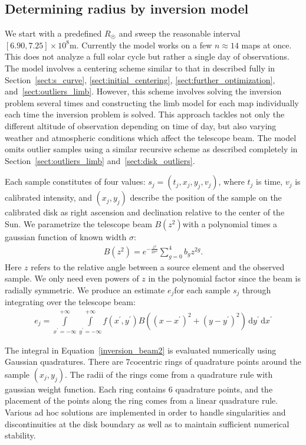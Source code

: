 \documentclass{aa}
\newcommand{\eqnl}[2]{\begin{eqnarray}\label{#1}#2\end{eqnarray}}
\newcommand{\intef}[4]{\int \limits_{#1 = #2}^{#3} \! #4 \, \mathrm{d} #1}
\begin{document}
  \subsection{Determining radius by inversion model} \label{sect:radius_method2}

  We start with a predefined $R_{\astrosun}$ and sweep the reasonable interval $[6.90, 7.25] \times 10^8 \mathrm{m}$. 
  Currently the model works on a few $n \approx 14$ maps at once. This does not analyze a full solar cycle but rather a 
  single day of observations. The model involves a centering scheme similar to that in described fully in 
  Section~\ref{sect:s_curve}, \ref{sect:initial_centering}, \ref{sect:further_optimization}, and~\ref{sect:outliers_limb}. However, this 
  scheme involves solving the inversion problem several times and constructing the limb model for each map individually 
  each time the inversion problem is solved. This approach tackles not only the different altitude of observation 
  depending on time of day, but also varying weather and atmospheric conditions which affect the telescope beam. The 
  model omits outlier samples using a similar recursive scheme as described completely in 
  Section~\ref{sect:outliers_limb} and~\ref{sect:disk_outliers}.

  Each sample constitutes of four values: $s_j = (t_j, x_j, y_j, v_j)$, where $t_j$ is time, $v_j$ is calibrated intensity, 
  and $(x_j,y_j)$ describe the position of the sample on the calibrated disk as right ascension and declination 
  relative to the center of the Sun. We parametrize the telescope beam $B(z^2)$with a polynomial times a gaussian function of known width $\sigma$:
  \eqnl{inversion_beam}{
  B(z^2) = e^{-\frac{z^2}{2 \sigma^2}} \sum \limits_{g=0}^{4} b_g z^{2g} \text{.}
  }
  Here $z$ refers to the relative angle between a source element and the observed sample. We only need even powers of $z$ in the polynomial factor since the beam is radially symmetric. We produce an estimate $e_j$for each sample $s_j$ through integrating over the telescope beam:
  \eqnl{inversion_beam2}{
  e_j = \intef{x^{\prime}}{-\infty}{+\infty}{ \intef{y^{\prime}}{-\infty}{+\infty}{ f(x^{\prime}, y^{\prime}) B \left( \left( x - x^{\prime} \right)^2 + \left( y - y^{\prime} \right)^2 \right)}}
  }

  The integral in Equation~\ref{inversion_beam2} is evaluated numerically using Gaussian quadratures. There are 
  $7$cocentric rings of quadrature points around the sample $(x_j,y_j)$. The radii of the rings come from a quadrature 
  rule with gaussian weight function. Each ring contains $6$ quadrature points, and the placement of the points along the ring comes from a linear 
  quadrature rule. Various ad hoc solutions are implemented in order to handle singularities and discontinuities at the 
  disk boundary as well as to maintain sufficient numerical stability.
\end{document}
